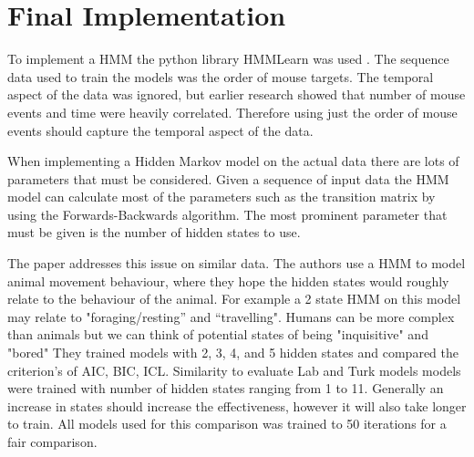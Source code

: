 \documentclass{article}
\begin{document}


\section{Final Implementation}


To implement a HMM the python library HMMLearn was used \cite{hmmlearn}.
The sequence data used to train the models was the order of mouse targets.
The temporal aspect of the data was ignored, but earlier research showed that number of mouse events and time were heavily correlated.
Therefore using just the order of mouse events should capture the temporal aspect of the data.

When implementing a Hidden Markov model on the actual data there are lots of parameters that must be considered. 
Given a sequence of input data the HMM model can calculate most of the parameters such as the transition matrix by using the Forwards-Backwards algorithm.
The most prominent parameter that must be given is the number of hidden states to use.

The paper \cite{pohle2017selecting} addresses this issue on similar data.
The authors use a HMM to model animal movement behaviour, where they hope the hidden states would roughly relate to the behaviour of the animal.
For example a 2 state HMM on this model may relate to "foraging/resting” and “travelling".
Humans can be more complex than animals but we can think of potential states of being "inquisitive" and "bored"
They trained models with 2, 3, 4, and 5 hidden states and compared the criterion's of AIC, BIC, ICL.
Similarity to evaluate Lab and Turk models models were trained with number of hidden states ranging from 1 to 11.
Generally an increase in states should increase the effectiveness, however it will also take longer to train.
All models used for this comparison was trained to 50 iterations for a fair comparison. 
\end{document}
